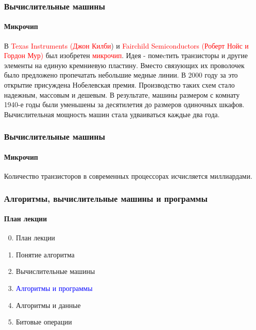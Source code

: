 \documentclass[aspectratio=169]{beamer}
\begin{document}
\begin{frame}
\frametitle{Вычислительные машины}
\framesubtitle{Микрочип}
\justifying
\small
В \textcolor{red}{Texas Instruments (Джон Килби}) и \textcolor{red}{Fairchild Semiconductors (Роберт Нойс и Гордон Мур)} был изобретен \textcolor{red}{микрочип}. Идея - помеcтить транзисторы и другие элементы на единую кремниевую пластину. Вместо связующих их проволочек было предложено пропечатать небольшие медные линии. В 2000 году за это открытие присуждена Нобелевская премия.\newline\newline 
Производство таких схем стало надежным, массовым и дешевым. В результате, машины размером с комнату 1940-е годы были уменьшены за десятилетия до размеров одиночных шкафов. Вычислительная мощность машин стала удваиваться каждые два года.

\begin{figure}
    \captionsetup[subfigure]{labelformat=empty}
    \centering
\end{figure}
\end{frame}

\begin{frame}
\frametitle{Вычислительные машины}
\framesubtitle{Микрочип}
\justifying
\small

Количество транзисторов в современных процессорах исчисляется миллиардами.

\begin{figure}
    \captionsetup[subfigure]{labelformat=empty}
    \centering
\end{figure}
\end{frame}

\begin{frame}
\frametitle{Алгоритмы, вычислительные машины и программы}
\framesubtitle{План лекции}

\begin{enumerate}
  \setcounter{enumi}{-1}
  \item{План лекции}
  \item{Понятие алгоритма}
  \item{Вычислительные машины}
  \item{\textcolor{blue}{Алгоритмы и программы}}
  \item{Алгоритмы и данные}
  \item{Битовые операции}

\end{enumerate}
\end{frame}
\end{document}
